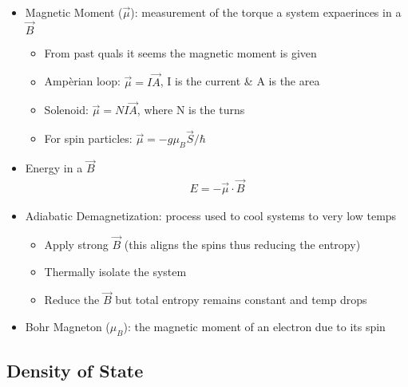 \begin{itemize}
	\item Magnetic Moment ($\vec{\mu}$): measurement of the torque a system expaerinces in a $\vec{B}$
	      \begin{itemize}
		      \item From past quals it seems the magnetic moment is given
		      \item Ampèrian loop: $\vec{\mu} = I \vec{A}$, I is the current \& A is the area
		      \item Solenoid: $\vec{\mu} = N I \vec{A}$, where N is the turns
		      \item For spin particles: $\vec{\mu} = -g \mu_B \vec{S} / \hbar$
	      \end{itemize}
	\item Energy in a $\vec{B}$
	      \begin{align}
		      E = - \vec{\mu} \cdot \vec{B}
	      \end{align}
	\item Adiabatic Demagnetization: process used to cool systems to very low temps
	      \begin{itemize}
		      \item Apply strong $\vec{B}$ (this aligns the spins thus reducing the entropy)
		      \item Thermally isolate the system
		      \item Reduce the $\vec{B}$ but total entropy remains constant and temp drops
	      \end{itemize}
	\item Bohr Magneton ($\mu_B$): the magnetic moment of an electron due to its spin
\end{itemize}


\subsection{Density of State}